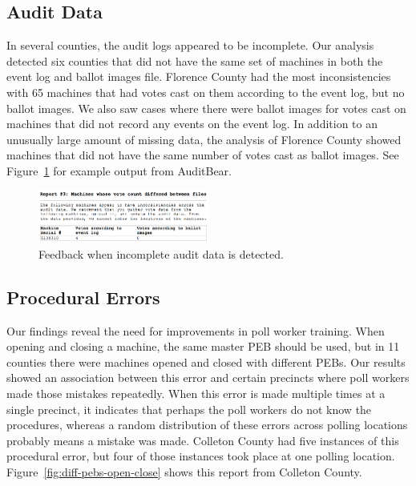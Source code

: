 \documentclass[letterpaper,twocolumn,10pt]{article}
\begin{document}
\subsection{Audit Data}
 In several counties, the audit logs appeared to be incomplete. Our analysis
 detected six counties that did not have the same set of machines in both the
 event log and ballot images file. Florence County had the most inconsistencies
 with 65 machines that had votes cast on them according to the event log, but no
 ballot images. We also saw cases where there were ballot images for votes cast
 on machines that did not record any events on the event log. In addition to an
 unusually large amount of missing data, the analysis of Florence County showed
 machines that did not have the same number of votes cast as ballot images. See
 Figure~\ref{fig:incomplete-audit-data} for example output from AuditBear. 

\begin{figure}[htbp]
\begin{center}
    \includegraphics[width=0.5\textwidth,height=0.2\textheight]{IncompleteAuditData.eps}
\end{center}
\caption{Feedback when incomplete audit data is detected.}
\label{fig:incomplete-audit-data}
\end{figure}


\subsection{Procedural Errors}
Our findings reveal the need for improvements in poll worker training. When
opening and closing a machine, the same master PEB should be used, but in 11
counties there were machines opened and closed with different PEBs. Our results
showed an association between this error and certain precincts where poll workers
made those mistakes repeatedly.  
When this error is made multiple times at a single precinct, it indicates 
that perhaps the poll workers do
not know the procedures, whereas a random distribution of these errors across
polling locations probably means a mistake was made. Colleton County had five
instances of this procedural error, but four of those instances took place at
one polling location. Figure~\ref{fig:diff-pebs-open-close} shows this report
from Colleton County.  
\end{document}
